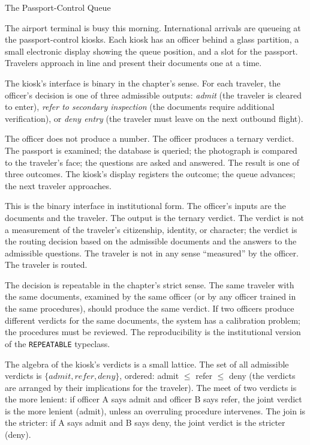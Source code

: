 \begin{coda}{The Passport-Control Queue}

The airport terminal is busy this morning. International arrivals are
queueing at the passport-control kiosks. Each kiosk has an officer behind
a glass partition, a small electronic display showing the queue position,
and a slot for the passport. Travelers approach in line and present their
documents one at a time.

The kiosk's interface is binary in the chapter's sense. For each
traveler, the officer's decision is one of three admissible outputs:
\emph{admit} (the traveler is cleared to enter), \emph{refer to secondary
inspection} (the documents require additional verification), or \emph{deny
entry} (the traveler must leave on the next outbound flight).

The officer does not produce a number. The officer produces a ternary
verdict. The passport is examined; the database is queried; the
photograph is compared to the traveler's face; the questions are asked
and answered. The result is one of three outcomes. The kiosk's
display registers the outcome; the queue advances; the next traveler
approaches.

This is the binary interface in institutional form. The officer's
inputs are the documents and the traveler. The output is the ternary
verdict. The verdict is not a measurement of the traveler's
citizenship, identity, or character; the verdict is the routing
decision based on the admissible documents and the answers to the
admissible questions. The traveler is not in any sense ``measured'' by
the officer. The traveler is routed.

The decision is repeatable in the chapter's strict sense. The same
traveler with the same documents, examined by the same officer (or by
any officer trained in the same procedures), should produce the same
verdict. If two officers produce different verdicts for the same
documents, the system has a calibration problem; the procedures must
be reviewed. The reproducibility is the institutional version of the
\texttt{REPEATABLE} typeclass.

The algebra of the kiosk's verdicts is a small lattice. The set of
all admissible verdicts is $\{admit, refer, deny\}$, ordered: admit
$\le$ refer $\le$ deny (the verdicts are arranged by their
implications for the traveler). The meet of two verdicts is the
more lenient: if officer A says admit and officer B says refer, the
joint verdict is the more lenient (admit), unless an overruling
procedure intervenes. The join is the stricter: if A says admit and
B says deny, the joint verdict is the stricter (deny).


\end{coda}
